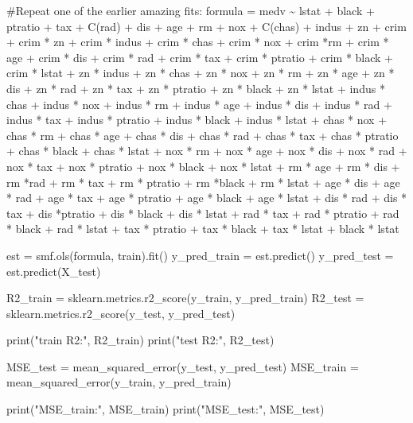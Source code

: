\documentclass[
  letterpaper,
  DIV=11,
  numbers=noendperiod]{scrreprt}
\newenvironment{Shaded}{\begin{snugshade}}{\end{snugshade}}
\newcommand{\BuiltInTok}[1]{\textcolor[rgb]{0.00,0.23,0.31}{#1}}
\newcommand{\CommentTok}[1]{\textcolor[rgb]{0.37,0.37,0.37}{#1}}
\newcommand{\NormalTok}[1]{\textcolor[rgb]{0.00,0.23,0.31}{#1}}
\newcommand{\OperatorTok}[1]{\textcolor[rgb]{0.37,0.37,0.37}{#1}}
\newcommand{\StringTok}[1]{\textcolor[rgb]{0.13,0.47,0.30}{#1}}
\begin{document}
\begin{Shaded}
\begin{Highlighting}[]
\CommentTok{\#Repeat one of the earlier amazing fits:}
\NormalTok{formula }\OperatorTok{=} \StringTok{\textquotesingle{}medv \textasciitilde{} lstat + black + ptratio + tax + C(rad) + dis + age + rm + nox + C(chas) + indus + zn + crim + crim * zn + crim * indus + crim * chas + crim * nox + crim *rm + crim * age + crim * dis + crim * rad + crim * tax + crim * ptratio + crim * black + crim * lstat + zn * indus + zn * chas + zn * nox + zn * rm + zn * age + zn * dis + zn * rad + zn * tax + zn * ptratio + zn * black + zn * lstat + indus * chas + indus * nox + indus * rm + indus * age + indus * dis + indus * rad + indus * tax + indus * ptratio + indus * black + indus * lstat + chas * nox + chas * rm + chas * age + chas * dis + chas * rad + chas * tax + chas * ptratio + chas * black + chas * lstat + nox * rm + nox * age + nox * dis + nox * rad + nox * tax + nox * ptratio + nox * black + nox * lstat + rm * age + rm * dis + rm *rad + rm * tax + rm * ptratio + rm *black + rm * lstat + age * dis + age * rad + age * tax + age * ptratio + age * black + age * lstat + dis * rad + dis * tax + dis *ptratio + dis * black + dis * lstat + rad * tax + rad * ptratio + rad * black + rad * lstat + tax * ptratio + tax * black + tax * lstat + black * lstat \textquotesingle{}}

\NormalTok{est }\OperatorTok{=}\NormalTok{ smf.ols(formula, train).fit()}
\NormalTok{y\_pred\_train }\OperatorTok{=}\NormalTok{ est.predict()}
\NormalTok{y\_pred\_test }\OperatorTok{=}\NormalTok{ est.predict(X\_test)}

\NormalTok{R2\_train }\OperatorTok{=}\NormalTok{ sklearn.metrics.r2\_score(y\_train, y\_pred\_train)}
\NormalTok{R2\_test }\OperatorTok{=}\NormalTok{ sklearn.metrics.r2\_score(y\_test, y\_pred\_test)}

\BuiltInTok{print}\NormalTok{(}\StringTok{"train R2:"}\NormalTok{, R2\_train)}
\BuiltInTok{print}\NormalTok{(}\StringTok{"test R2:"}\NormalTok{, R2\_test)}

\NormalTok{MSE\_test }\OperatorTok{=}\NormalTok{ mean\_squared\_error(y\_test, y\_pred\_test)}
\NormalTok{MSE\_train }\OperatorTok{=}\NormalTok{ mean\_squared\_error(y\_train, y\_pred\_train)}

\BuiltInTok{print}\NormalTok{(}\StringTok{"MSE\_train:"}\NormalTok{, MSE\_train)}
\BuiltInTok{print}\NormalTok{(}\StringTok{"MSE\_test:"}\NormalTok{, MSE\_test)}
\end{Highlighting}
\end{Shaded}
\end{document}
